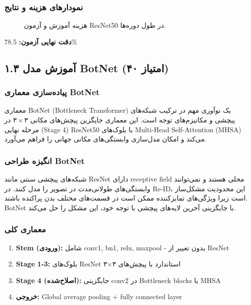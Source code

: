 \documentclass[12pt,a4paper]{article}
\theoremstyle{definition}
\begin{document}
\subsubsection*{نمودارهای هزینه و نتایج}
\begin{figure}[H]
    \centering
    \caption{هزینه آموزش و آزمون ResNet50 در طول دوره‌ها.}
    \label{fig:resnet_loss}
\end{figure}

\textbf{دقت نهایی آزمون:} 78.5\%

\subsection{۱.۳ آموزش مدل BotNet (۴۰ امتیاز)}

\subsubsection*{پیاده‌سازی معماری BotNet}
معماری BotNet (Bottleneck Transformer) یک نوآوری مهم در ترکیب شبکه‌های پیچشی و مکانیزم‌های توجه است. این معماری جایگزین پیچش‌های مکانی $۳ \times ۳$ در مرحله نهایی (Stage 4) ResNet50 با بلوک‌های Multi-Head Self-Attention (MHSA) می‌کند و امکان مدل‌سازی وابستگی‌های مکانی جهانی را فراهم می‌آورد.

\subsubsection*{انگیزه طراحی BotNet}
شبکه‌های پیچشی سنتی مانند ResNet دارای receptive field محلی هستند و نمی‌توانند وابستگی‌های طولانی‌مدت در تصویر را مدل کنند. در Re-ID، این محدودیت مشکل‌ساز است زیرا ویژگی‌های تمایزکننده ممکن است در قسمت‌های مختلف بدن پراکنده باشند. BotNet با جایگزینی آخرین لایه‌های پیچشی با توجه خود، این مشکل را حل می‌کند.

\subsubsection*{معماری کلی}
\begin{enumerate}
    \item \textbf{Stem (ورودی):} شامل conv1, bn1, relu, maxpool - بدون تغییر از ResNet
    \item \textbf{Stage 1-3:} بلوک‌های ResNet استاندارد با پیچش‌های ۳×۳
    \item \textbf{Stage 4 (اصلاح‌شده):} جایگزینی conv2 در Bottleneck blocks با MHSA
    \item \textbf{خروجی:} Global average pooling + fully connected layer
\end{enumerate}
\end{document}
